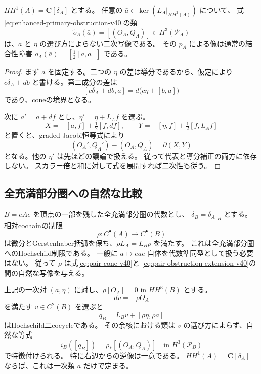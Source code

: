\begin{proposition}[一次類だけから定まる増強された障害]
\label{prop:enhanced-canonical-obstruction-v40}
$HH^1(A)=\mathbf C[\delta_A]$ とする。
任意の $\bar a\in\ker(L_A|_{HH^2(A)})$ について、
式\eqref{eq:enhanced-primary-obstruction-v40}の類
\[
 \widetilde o_A(\bar a)=[(O_A,Q_A)]\in H^3(\mathcal P_A)
\]
は、$a$ と $\eta$ の選び方によらない二次写像である。
その $p_A$ による像は通常の結合性障害
$o_A(\bar a)=[\tfrac12[a,a]]$ である。
\end{proposition}

\begin{proof}
まず $a$ を固定する。二つの $\eta$ の差は導分であるから、仮定により
$c\delta_A+db$ と書ける。第二成分の差は
\[
 [c\delta_A+db,a]=d\bigl(c\eta+[b,a]\bigr)
\]
であり、coneの境界となる。

次に $a'=a+df$ とし、$\eta'=\eta+L_Af$ を選ぶ。
\[
 X=-[a,f]+\tfrac12[f,df],\qquad
 Y=-[\eta,f]+\tfrac12[f,L_Af]
\]
と置くと、graded Jacobi恒等式により
\[
 (O_A',Q_A')-(O_A,Q_A)=\partial(X,Y)
\]
となる。他の $\eta'$ は先ほどの議論で扱える。
従って代表と導分補正の両方に依存しない。
スカラー倍と和に対して式を展開すれば二次性も従う。
\end{proof}

\subsection{全充満部分圏への自然な比較}

$B=eAe$ を頂点の一部を残した全充満部分圏の代数とし、
$\delta_B=\delta_A|_B$ とする。
相対cochainの制限
\[
 \rho:C^\bullet(A)\longrightarrow C^\bullet(B)
\]
は微分とGerstenhaber括弧を保ち、$\rho L_A=L_B\rho$ を満たす。
これは全充満部分圏へのHochschild制限である。
一般に $a\mapsto eae$ 自体を代数準同型として扱う必要はない。
従って $\rho$ は式\eqref{eq:pair-cone-v40}と
\eqref{eq:pair-obstruction-extension-v40}の間の自然な写像を与える。

\begin{theorem}[結合性障害が消えた後の対称性障害]
\label{thm:obstruction-transgression-v40}
上記の一次対 $(a,\eta)$ に対し、$\rho[O_A]=0$ in $HH^3(B)$ とする。
\[
 dv=-\rho O_A
\]
を満たす $v\in C^2(B)$ を選ぶと
\begin{equation}
 q_B=L_Bv+[\rho\eta,\rho a]
 \label{eq:obstruction-transgression-v40}
\end{equation}
はHochschild二cocycleである。
その余核における類は $v$ の選び方によらず、自然な等式
\begin{equation}
 i_B([q_B])=\rho_*[(O_A,Q_A)]
 \quad\text{in }H^3(\mathcal P_B)
 \label{eq:obstruction-transgression-naturality-v40}
\end{equation}
で特徴付けられる。
特に右辺からの逆像は一意である。
$HH^1(A)=\mathbf C[\delta_A]$ ならば、これは一次類 $\bar a$ だけで定まる。
\end{theorem}

